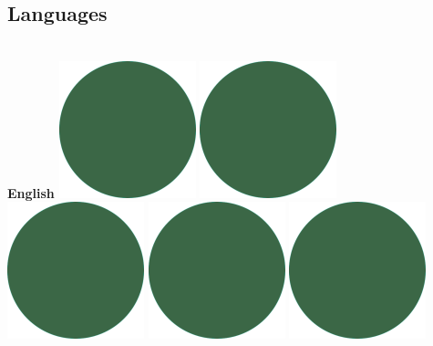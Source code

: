 \documentclass[]{friggeri-cv_reccius-experiment}
\begin{document}
\begin{below1}
  \section{Languages}
    \\\vspace{1.7mm}
    \textbf{English}\hfill
    \includegraphics[scale=0.11]{img/IPSGreenDots.png}
    \includegraphics[scale=0.11]{img/IPSGreenDots.png}
    \includegraphics[scale=0.11]{img/IPSGreenDots.png}
    \includegraphics[scale=0.11]{img/IPSGreenDots.png}
    \includegraphics[scale=0.11]{img/IPSGreenDots.png}

\end{below1}
\end{document}
